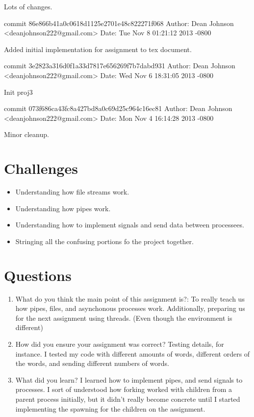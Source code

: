 \documentclass[fleqn,10pt,titlepage]{article}
\begin{document}
    Lots of changes.

commit 86e866b41a0c0618d1125e2701e48c822271f068
Author: Dean Johnson <deanjohnson222@gmail.com>
Date:   Tue Nov 8 01:21:12 2013 -0800

    Added initial implementation for assignment to tex document.

commit 3e2823a316d0f1a33d7817e656269f7b7dabd931
Author: Dean Johnson <deanjohnson222@gmail.com>
Date:   Wed Nov 6 18:31:05 2013 -0800

    Init proj3

commit 073f686ca43fc8a427bd8a0c69d25c964c16ec81
Author: Dean Johnson <deanjohnson222@gmail.com>
Date:   Mon Nov 4 16:14:28 2013 -0800

    Minor cleanup.
\clearpage

\section{Challenges}
\begin{itemize}
\item Understanding how file streams work.
\item Understanding how pipes work.
\item Understanding how to implement signals and send data between processees.
\item Stringing all the confusing portions fo the project together.
\end{itemize}
\clearpage

\section{Questions}
\begin{enumerate}
\item What do you think the main point of this assignment is?:  To really teach us how pipes, files, and 
asynchonous processes work. Additionally, preparing us for the next assignment using threads. (Even though
the environment is different)\\ 
\item How did you ensure your assignment was correct? Testing details, for instance. I tested my code with
different amounts of words, different orders of the words, and sending different numbers of words.\\ 
\item What did you learn? I learned how to implement pipes, and send signals to processes. I sort of understood
how forking worked with children from a parent process initially, but it didn't really become concrete until I
started implementing the spawning for the children on the assignment.\\ 
\end{enumerate}
\end{document}
